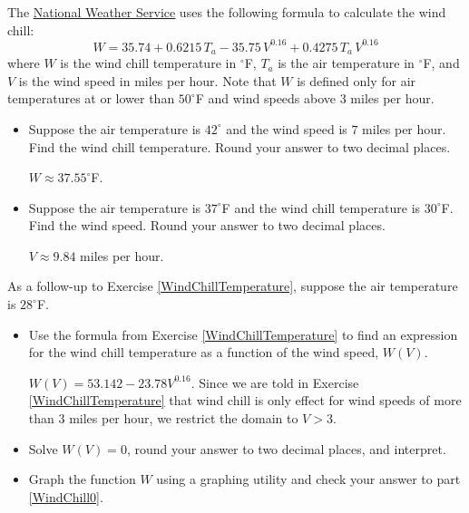 \documentclass{ximera}
\begin{document}
\begin{problem} \label{WindChillTemperature}
The \href{http://www.nws.noaa.gov/om/windchill/windchillglossary.shtml}{\underline{National Weather Service}} uses the following formula to calculate the wind chill: \[ W = 35.74 + 0.6215 \, T_{a} - 35.75\, V^{0.16} + 0.4275 \, T_{a} \, V^{0.16}  \] where $W$ is the wind chill temperature in $^{\circ}$F, $T_{a}$ is the air temperature in $^{\circ}$F, and  $V$ is the wind speed in miles per hour.  Note that $W$ is defined only for air temperatures at or lower than $50^{\circ}$F and wind speeds above $3$ miles per hour.

\begin{itemize}
\item 
Suppose the air temperature is $42^{\circ}$ and the wind speed is $7$ miles per hour. Find the wind chill temperature.  Round your answer to two decimal places.

\begin{solution}
$W \approx 37.55^{\circ}$F.
\end{solution}

\item 
Suppose the air temperature is $37^{\circ}$F and the wind chill temperature is $30^{\circ}$F.  Find the wind speed.  Round your answer to two decimal places.

\begin{solution}
$V \approx 9.84$ miles per hour.
\end{solution}
\end{itemize}
\end{problem}

\begin{problem}
As a follow-up to Exercise \ref{WindChillTemperature}, suppose the air temperature is $28^{\circ}$F.

\begin{itemize}
\item 
Use the formula from Exercise \ref{WindChillTemperature} to find an expression for the wind chill temperature as a function of the wind speed, $W(V)$.

\begin{solution}
$W(V) = 53.142 - 23.78 V^{0.16}$.  Since we are told in Exercise \ref{WindChillTemperature} that wind chill is only effect for wind speeds of more than 3 miles per hour, we restrict the domain to $V > 3$.
\end{solution}

\item 
Solve $W(V) = 0$, round your answer to two decimal places,  and interpret.

\begin{solution}

\end{solution}

\item 
Graph the function $W$ using a graphing utility and check your answer to part \ref{WindChill0}.
\begin{solution}

\end{solution}
\end{itemize}
\end{problem}
\end{document}
